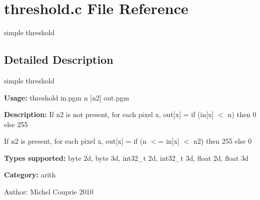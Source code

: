 \section{threshold.c File Reference}
\label{threshold_8c}
simple threshold  




\label{_details}
\subsection{Detailed Description}
simple threshold 

{\bf Usage:} threshold in.pgm n [n2] out.pgm

{\bf Description:} If n2 is not present, for each pixel x, out[x] = if (in[x] $<$ n) then 0 else 255

If n2 is present, for each pixel x, out[x] = if (n $<$= in[x] $<$ n2) then 255 else 0

{\bf Types supported:} byte 2d, byte 3d, int32\_\-t 2d, int32\_\-t 3d, float 2d, float 3d

{\bf Category:} arith

\begin{Desc}
\item[Author:]Michel Couprie 2010 \end{Desc}
